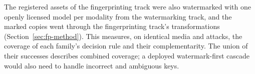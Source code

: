 The registered assets of the fingerprinting track were also watermarked with one openly licensed model per modality from the watermarking track, and the marked copies went through the fingerprinting track's transformations (Section~\ref{sec:fp-method}). This measures, on identical media and attacks, the coverage of each family's decision rule and their complementarity. The union of their successes describes combined coverage; a deployed watermark-first cascade would also need to handle incorrect and ambiguous keys.
